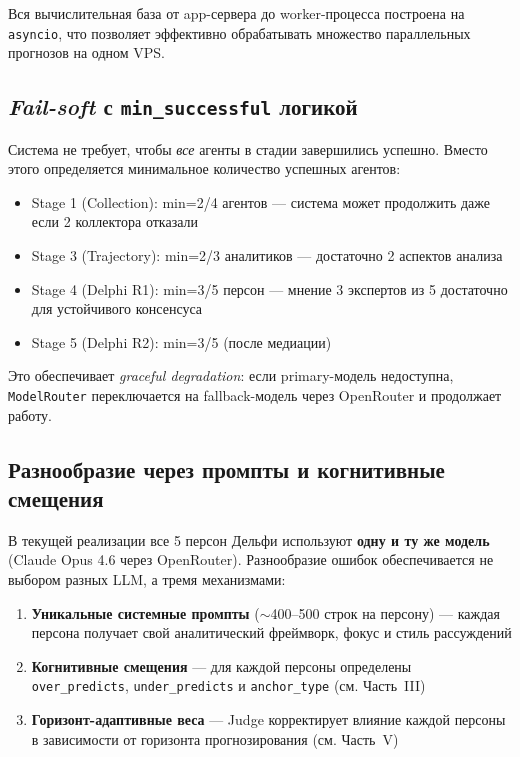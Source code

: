 \noindent Вся вычислительная база от app-сервера до worker-процесса построена на \texttt{asyncio}, что позволяет эффективно обрабатывать множество параллельных прогнозов на одном VPS.

\subsection{\emph{Fail-soft} с \texttt{min\_successful} логикой}

Система не требует, чтобы \textit{все} агенты в стадии завершились успешно. Вместо этого определяется минимальное количество успешных агентов:

\begin{itemize}[nosep]
\item Stage 1 (Collection): min=2/4 агентов — система может продолжить даже если 2 коллектора отказали
\item Stage 3 (Trajectory): min=2/3 аналитиков — достаточно 2 аспектов анализа
\item Stage 4 (Delphi R1): min=3/5 персон — мнение 3 экспертов из 5 достаточно для устойчивого консенсуса
\item Stage 5 (Delphi R2): min=3/5 (после медиации)
\end{itemize}

\noindent Это обеспечивает \emph{graceful degradation}: если primary-модель недоступна, \texttt{ModelRouter} переключается на fallback-модель через OpenRouter и продолжает работу.

\subsection{Разнообразие через промпты и когнитивные смещения}


В текущей реализации все 5 персон Дельфи используют \textbf{одну и ту же модель} (Claude Opus 4.6 через OpenRouter). Разнообразие ошибок обеспечивается не выбором разных LLM, а тремя механизмами:

\begin{enumerate}[nosep]
\item \textbf{Уникальные системные промпты} ($\sim$400--500 строк на персону) --- каждая персона получает свой аналитический фреймворк, фокус и стиль рассуждений
\item \textbf{Когнитивные смещения} --- для каждой персоны определены \texttt{over\_predicts}, \texttt{under\_predicts} и \texttt{anchor\_type} (см. Часть~III)
\item \textbf{Горизонт-адаптивные веса} --- Judge корректирует влияние каждой персоны в зависимости от горизонта прогнозирования (см. Часть~V)
\end{enumerate}

